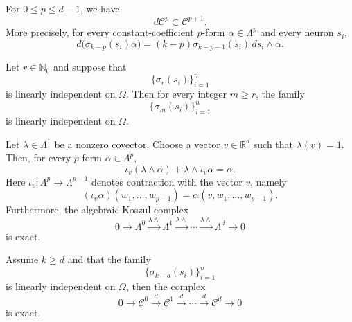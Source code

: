 \documentclass[10pt,a4paper]{amsart}
\begin{document}
\begin{proposition}\label{prop:inclusion}
For $0\le p\le d-1$, we have
\begin{equation}
d\mathcal C^p\subset \mathcal C^{p+1}.
\end{equation}
More precisely, for every constant-coefficient $p$-form
$\alpha\in\Lambda^p$ and every neuron $s_i$,
\begin{equation}
d\bigl(\sigma_{k-p}(s_i)\alpha\bigr)
=
(k-p)\sigma_{k-p-1}(s_i)\,ds_i\wedge\alpha .
\end{equation}
\end{proposition}

\begin{lemma}\label{lem:induction}
    Let $r\in\mathbb N_0$ and suppose that
    \begin{equation}
    \{\sigma_r(s_i)\}_{i=1}^n
    \end{equation}
    is linearly independent on $\Omega$. Then for every integer $m\ge r$, the family
    \begin{equation}
    \{\sigma_m(s_i)\}_{i=1}^n
    \end{equation}
    is linearly independent on $\Omega$.
\end{lemma}

\begin{lemma}\label{lem:koszul}
Let $\lambda\in\Lambda^1$ be a nonzero covector. Choose a vector $v\in\mathbb R^d$ such that $\lambda(v)=1$. Then, for every $p$-form $\alpha\in\Lambda^p$,
\begin{equation}\label{eq:homo}
\iota_v(\lambda\wedge \alpha)+\lambda\wedge \iota_v\alpha=\alpha.
\end{equation}
Here $\iota_v:\Lambda^p\rightarrow\Lambda^{p-1}$ denotes contraction with the vector $v$, namely
\begin{equation}
(\iota_v\alpha)(w_1,\ldots,w_{p-1})=\alpha(v,w_1,\ldots,w_{p-1}).
\end{equation}
Furthermore, the algebraic Koszul complex
\begin{equation}
0\longrightarrow \Lambda^0
\xrightarrow{\lambda\wedge}
\Lambda^1
\xrightarrow{\lambda\wedge}
\cdots
\xrightarrow{\lambda\wedge}
\Lambda^d
\longrightarrow 0
\end{equation}
is exact.
\end{lemma}

\begin{theorem}\label{thm:exact}
    Assume $k\ge d$ and that the family
    \begin{equation}
    \{\sigma_{k-d}(s_i)\}_{i=1}^n
    \end{equation}
    is linearly independent on $\Omega$, then the complex
    \begin{equation}\label{eq:derham}
        0\longrightarrow\mathcal C ^0 \xrightarrow{d} \mathcal C ^1 \xrightarrow{d}
        \cdots \xrightarrow{d} \mathcal C ^d \longrightarrow 0
    \end{equation}
    is exact.
\end{theorem}
\end{document}
